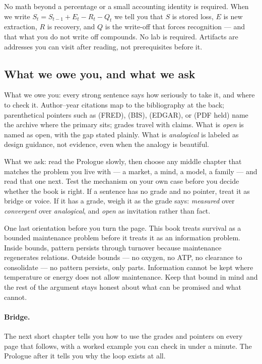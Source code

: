 No math beyond a percentage or a small accounting identity is required. When we write $S_t = S_{t-1} + E_t - R_t - Q_t$ we tell you that $S$ is stored loss, $E$ is new extraction, $R$ is recovery, and $Q$ is the write-off that forces recognition --- and that what you do not write off compounds. No lab is required. Artifacts are addresses you can visit after reading, not prerequisites before it.

\subsection*{What we owe you, and what we ask}

What we owe you: every strong sentence says how seriously to take it, and where to check it. Author--year citations map to the bibliography at the back; parenthetical pointers such as (FRED), (BIS), (EDGAR), or (PDF held) name the archive where the primary sits; grades travel with claims. What is \textit{open} is named as open, with the gap stated plainly. What is \textit{analogical} is labeled as design guidance, not evidence, even when the analogy is beautiful.

What we ask: read the Prologue slowly, then choose any middle chapter that matches the problem you live with --- a market, a mind, a model, a family --- and read that one next. Test the mechanism on your own case before you decide whether the book is right. If a sentence has no grade and no pointer, treat it as bridge or voice. If it has a grade, weigh it as the grade says: \textit{measured} over \textit{convergent} over \textit{analogical}, and \textit{open} as invitation rather than fact.

One last orientation before you turn the page. This book treats survival as a bounded maintenance problem before it treats it as an information problem. Inside bounds, pattern persists through turnover because maintenance regenerates relations. Outside bounds --- no oxygen, no ATP, no clearance to consolidate --- no pattern persists, only parts. Information cannot be kept where temperature or energy does not allow maintenance. Keep that bound in mind and the rest of the argument stays honest about what can be promised and what cannot.

\paragraph{Bridge.} The next short chapter tells you how to use the grades and pointers on every page that follows, with a worked example you can check in under a minute. The Prologue after it tells you why the loop exists at all.
